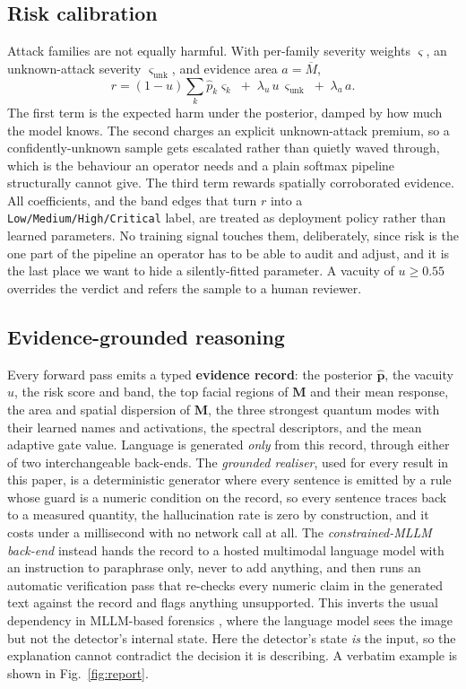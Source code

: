 \documentclass[conference]{IEEEtran}
\newcommand{\bs}[1]{\boldsymbol{#1}}
\begin{document}
\subsection{Risk calibration}
Attack families are not equally harmful. With per-family severity weights
$\bs{\varsigma}$, an unknown-attack severity $\varsigma_{\text{unk}}$, and evidence
area $a=\overline{M}$,
\begin{equation}
r = (1-u)\sum_{k}\hat{p}_{k}\varsigma_{k} \;+\; \lambda_{u}\,u\,\varsigma_{\text{unk}}
\;+\; \lambda_{a}\,a .
\label{eq:risk}
\end{equation}
The first term is the expected harm under the posterior, damped by how much the
model knows. The second charges an explicit unknown-attack premium, so a
confidently-unknown sample gets escalated rather than quietly waved through, which is
the behaviour an operator needs and a plain softmax pipeline structurally cannot
give. The third term rewards spatially corroborated evidence. All coefficients, and
the band edges that turn $r$ into a \texttt{Low/Medium/High/Critical} label, are
treated as deployment policy rather than learned parameters. No training signal
touches them, deliberately, since risk is the one part of the pipeline an operator
has to be able to audit and adjust, and it is the last place we want to hide a
silently-fitted parameter. A vacuity of $u\ge0.55$ overrides the verdict and refers
the sample to a human reviewer.

\subsection{Evidence-grounded reasoning}
Every forward pass emits a typed \textbf{evidence record}: the posterior
$\hat{\bs{p}}$, the vacuity $u$, the risk score and band, the top facial regions of
$\bs{M}$ and their mean response, the area and spatial dispersion of $\bs{M}$, the
three strongest quantum modes with their learned names and activations, the spectral
descriptors, and the mean adaptive gate value. Language is generated \emph{only}
from this record, through either of two interchangeable back-ends. The
\emph{grounded realiser}, used for every result in this paper, is a deterministic
generator where every sentence is emitted by a rule whose guard is a numeric
condition on the record, so every sentence traces back to a measured quantity, the
hallucination rate is zero by construction, and it costs under a millisecond with no
network call at all. The \emph{constrained-MLLM back-end} instead hands the record to
a hosted multimodal language model with an instruction to paraphrase only, never to
add anything, and then runs an automatic verification pass that re-checks every
numeric claim in the generated text against the record and flags anything
unsupported. This inverts the usual dependency in MLLM-based forensics
\cite{huang2024ffaa,guo2025m2f2det}, where the language model sees the image but not
the detector's internal state. Here the detector's state \emph{is} the input, so the
explanation cannot contradict the decision it is describing. A verbatim example is
shown in Fig.~\ref{fig:report}.
\end{document}
